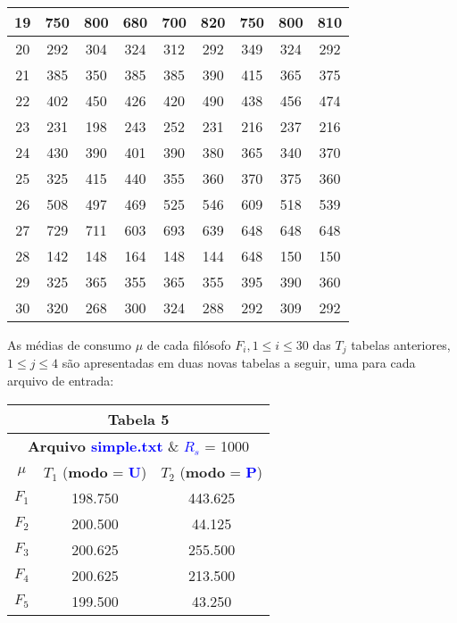 \documentclass[11pt]{article}
\begin{document}
\begin{table}[!h]
\begin{center}
\begin{tabular}{| c | c | c | c | c | c | c | c | c |}
			19 & 750 & 800 & 680 & 700 & 820 & 750 & 800 & 810 \\ \hline
			20 & 292 & 304 & 324 & 312 & 292 & 349 & 324 & 292 \\ \hline
			21 & 385 & 350 & 385 & 385 & 390 & 415 & 365 & 375 \\ \hline
			22 & 402 & 450 & 426 & 420 & 490 & 438 & 456 & 474 \\ \hline
			23 & 231 & 198 & 243 & 252 & 231 & 216 & 237 & 216 \\ \hline
			24 & 430 & 390 & 401 & 390 & 380 & 365 & 340 & 370 \\ \hline
			25 & 325 & 415 & 440 & 355 & 360 & 370 & 375 & 360 \\ \hline
			26 & 508 & 497 & 469 & 525 & 546 & 609 & 518 & 539 \\ \hline
			27 & 729 & 711 & 603 & 693 & 639 & 648 & 648 & 648 \\ \hline
			28 & 142 & 148 & 164 & 148 & 144 & 648 & 150 & 150 \\ \hline
			29 & 325 & 365 & 355 & 365 & 355 & 395 & 390 & 360 \\ \hline
			30 & 320 & 268 & 300 & 324 & 288 & 292 & 309 & 292 \\ \hline
		\end{tabular}
	\end{center}
\end{table}


As médias de consumo $\mu$ de cada filósofo $F_i, 1 \leq i \leq 30$ das $T_j$ tabelas anteriores, $1 \leq j \leq 4$ são apresentadas em duas novas tabelas a seguir, uma para cada arquivo de entrada:

\begin{table}[!h]
	\begin{center}
		\begin{tabular}{| c | c | c |}
		\hline
		\multicolumn{3}{|c|}{\textbf{Tabela 5}} \\ \hline
		\multicolumn{3}{|c|}{\textbf{Arquivo \textcolor{blue}{simple.txt}} \& \textbf{\textcolor{blue}{$R_s$}} = 1000  } \\ \hline
			$\mu$ & $T_1$ (\textbf{modo} = \textbf{\textcolor{blue}{U}}) & $T_2$ (\textbf{modo} = \textbf{\textcolor{blue}{P}}) \\ \hline 
			$F_1$ & 198.750 & 443.625 \\ \hline
			$F_2$ & 200.500 & 44.125  \\ \hline
			$F_3$ & 200.625 & 255.500 \\ \hline
			$F_4$ & 200.625 & 213.500 \\ \hline
			$F_5$ & 199.500 & 43.250  \\ \hline	
		\end{tabular}
	\end{center}
\end{table}
\end{document}
